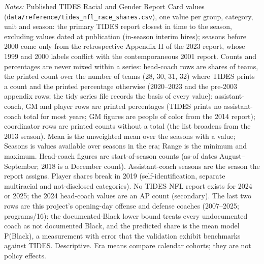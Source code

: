 \begin{table}[H]
\begin{minipage}{\textwidth}
\textit{Notes:} Published TIDES Racial and Gender Report Card values (\texttt{data/reference/tides\_nfl\_race\_shares.csv}), one value per group, category, unit and season: the primary TIDES report closest in time to the season, excluding values dated at publication (in-season interim hires); seasons before 2000 come only from the retrospective Appendix II of the 2023 report, whose 1999 and 2000 labels conflict with the contemporaneous 2001 report. Counts and percentages are never mixed within a series: head-coach rows are shares of teams, the printed count over the number of teams (28, 30, 31, 32) where TIDES prints a count and the printed percentage otherwise (2020--2023 and the pre-2003 appendix rows; the tidy series file records the basis of every value); assistant-coach, GM and player rows are printed percentages (TIDES prints no assistant-coach total for most years; GM figures are people of color from the 2014 report); coordinator rows are printed counts without a total (the list broadens from the 2013 season). Mean is the unweighted mean over the seasons with a value; Seasons is values available over seasons in the era; Range is the minimum and maximum. Head-coach figures are start-of-season counts (as-of dates August--September; 2018 is a December count). Assistant-coach seasons are the season the report assigns. Player shares break in 2019 (self-identification, separate multiracial and not-disclosed categories). No TIDES NFL report exists for 2024 or 2025; the 2024 head-coach values are an AP count (secondary). The last two rows are this project's opening-day offense and defense coaches (2007--2025; programs/16): the documented-Black lower bound treats every undocumented coach as not documented Black, and the predicted share is the mean model P(Black), a measurement with error that the validation exhibit benchmarks against TIDES. Descriptive. Era means compare calendar cohorts; they are not policy effects.
\end{minipage}
\end{table}
